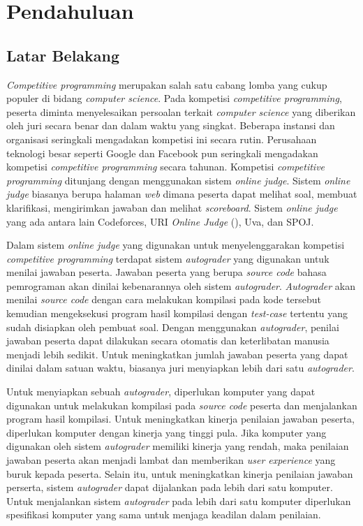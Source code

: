 \chapter{Pendahuluan}

\section{Latar Belakang}

\par \textit{Competitive programming} merupakan salah satu cabang lomba yang cukup populer di bidang \textit{computer science}. Pada kompetisi \textit{competitive programming}, peserta diminta menyelesaikan persoalan terkait \textit{computer science} yang diberikan oleh juri secara benar dan dalam waktu yang singkat. Beberapa instansi dan organisasi seringkali mengadakan kompetisi ini secara rutin. Perusahaan teknologi besar seperti Google dan Facebook pun seringkali mengadakan kompetisi \textit{competitive programming} secara tahunan. Kompetisi \textit{competitive programming} ditunjang dengan menggunakan sistem \textit{online judge}. Sistem \textit{online judge} biasanya berupa halaman \textit{web} dimana peserta dapat melihat soal, membuat klarifikasi, mengirimkan jawaban dan melihat \textit{scoreboard}. Sistem \textit{online judge} yang ada antara lain Codeforces, URI \textit{Online Judge} (\cite{uriojpaper}), Uva, dan SPOJ.

\par Dalam sistem \textit{online judge} yang digunakan untuk menyelenggarakan kompetisi \textit{competitive programming} terdapat sistem \textit{autograder} yang digunakan untuk menilai jawaban peserta. Jawaban peserta yang berupa \textit{source code} bahasa pemrograman akan dinilai kebenarannya oleh sistem \textit{autograder}. \textit{Autograder} akan menilai \textit{source code} dengan cara melakukan kompilasi pada kode tersebut kemudian mengeksekusi program hasil kompilasi dengan \textit{test-case} tertentu yang sudah disiapkan oleh pembuat soal. Dengan menggunakan \textit{autograder}, penilai jawaban peserta dapat dilakukan secara otomatis dan keterlibatan manusia menjadi lebih sedikit. Untuk meningkatkan jumlah jawaban peserta yang dapat dinilai dalam satuan waktu, biasanya juri menyiapkan lebih dari satu \textit{autograder}.

\par Untuk menyiapkan sebuah \textit{autograder}, diperlukan komputer yang dapat digunakan untuk melakukan kompilasi pada \textit{source code} peserta dan menjalankan program hasil kompilasi. Untuk meningkatkan kinerja penilaian jawaban peserta, diperlukan komputer dengan kinerja yang tinggi pula. Jika komputer yang digunakan oleh sistem \textit{autograder} memiliki kinerja yang rendah, maka penilaian jawaban peserta akan menjadi lambat dan memberikan \textit{user experience} yang buruk kepada peserta. Selain itu, untuk meningkatkan kinerja penilaian jawaban perserta, sistem \textit{autograder} dapat dijalankan pada lebih dari satu komputer. Untuk menjalankan sistem \textit{autograder} pada lebih dari satu komputer diperlukan spesifikasi komputer yang sama untuk menjaga keadilan dalam penilaian.

